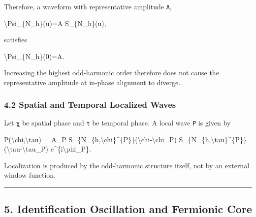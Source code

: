 \documentclass[
  a4paper,
]{article}
\newenvironment{Shaded}{}{}
\newcommand{\NormalTok}[1]{#1}
\begin{document}
Therefore, a waveform with representative amplitude \texttt{A},

\begin{Shaded}
\begin{Highlighting}[]
\NormalTok{\textbackslash{}Psi\_\{N\_h\}(u)=A S\_\{N\_h\}(u),}
\end{Highlighting}
\end{Shaded}

satisfies

\begin{Shaded}
\begin{Highlighting}[]
\NormalTok{\textbackslash{}Psi\_\{N\_h\}(0)=A.}
\end{Highlighting}
\end{Shaded}

Increasing the highest odd-harmonic order therefore does not cause the
representative amplitude at in-phase alignment to diverge.

\subsubsection{4.2 Spatial and Temporal Localized
Waves}\label{spatial-and-temporal-localized-waves}

Let \texttt{χ} be spatial phase and \texttt{τ} be temporal phase. A
local wave \texttt{P} is given by

\begin{Shaded}
\begin{Highlighting}[]
\NormalTok{P(\textbackslash{}chi,\textbackslash{}tau)}
\NormalTok{=}
\NormalTok{A\_P}
\NormalTok{S\_\{N\_\{h,\textbackslash{}chi\}\^{}\{P\}\}(\textbackslash{}chi{-}\textbackslash{}chi\_P)}
\NormalTok{S\_\{N\_\{h,\textbackslash{}tau\}\^{}\{P\}\}(\textbackslash{}tau{-}\textbackslash{}tau\_P)}
\NormalTok{e\^{}\{i\textbackslash{}phi\_P\}.}
\end{Highlighting}
\end{Shaded}

Localization is produced by the odd-harmonic structure itself, not by an
external window function.

\begin{center}\rule{0.5\linewidth}{0.5pt}\end{center}

\subsection{5. Identification Oscillation and Fermionic
Core}\label{identification-oscillation-and-fermionic-core}
\end{document}
